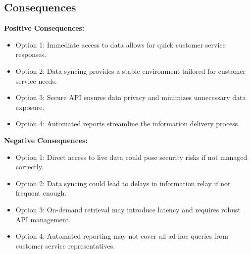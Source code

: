 \subsection*{Consequences}
\textbf{Positive Consequences:}
\begin{itemize}
    \item Option 1: Immediate access to data allows for quick customer service responses.
    \item Option 2: Data syncing provides a stable environment tailored for customer service needs.
    \item Option 3: Secure API ensures data privacy and minimizes unnecessary data exposure.
    \item Option 4: Automated reports streamline the information delivery process.
\end{itemize}
\textbf{Negative Consequences:}
\begin{itemize}
    \item Option 1: Direct access to live data could pose security risks if not managed correctly.
    \item Option 2: Data syncing could lead to delays in information relay if not frequent enough.
    \item Option 3: On-demand retrieval may introduce latency and requires robust API management.
    \item Option 4: Automated reporting may not cover all ad-hoc queries from customer service representatives.
\end{itemize}

